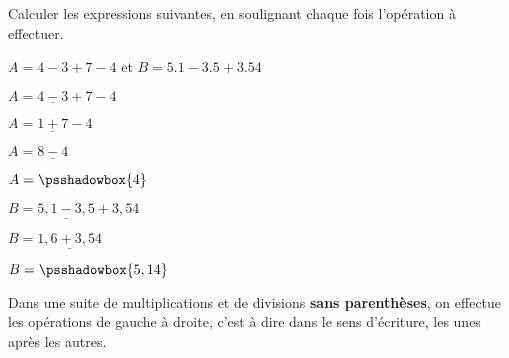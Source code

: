 \begin{exemple}
   Calculer les expressions suivantes, en soulignant chaque fois l'opération à effectuer.
   
   $A=4-3+7-4$ et $B=\num{5.1}-\num{3.5}+\num{3.54}$
   \correction
   
   \smallskip
   \begin{minipage}{0.5\linewidth}
      \begin{list}{}{}
               \item $A=\underline{4-3}+7-4$
               \item $A=\underline{1+7}-4$
               \item $A=\underline{8-4}$
               \item $A=\psshadowbox{4}$             
      \end{list}
   \end{minipage}      
   \begin{minipage}{0.5\linewidth}
      \begin{list}{}{}
         \item $B=\underline{5,1-3,5}+3,54$
         \item $B=\underline{1,6+3,54}$
         \item $B=\psshadowbox{5,14}$
      \end{list}
   \end{minipage}   
\end{exemple}

\begin{propriete}[\admise]   
   Dans une suite de multiplications et de divisions \textbf{sans parenthèses}, on effectue les opérations de gauche à droite, c'est à dire dans le sens d'écriture, les unes après les autres.
\end{propriete}

